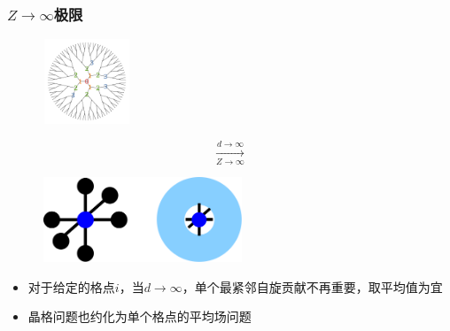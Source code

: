 {\frame
{
	\frametitle{$Z\rightarrow\infty$极限}
\begin{minipage}[b]{0.25\linewidth}
\begin{figure}[h!]
\centering
\includegraphics[height=1.0in,width=1.05in,viewport=0 0 1980 1980,clip]{Figures/Bethe-Lattice-Ising_Model.png}
\label{Bethe-Lattice_Ising-Model_Limit-1}
\end{figure}
\end{minipage}
\hfill
\begin{minipage}[t]{0.14\linewidth}
	\vspace{-1in} 
	\begin{displaymath}
		\xrightarrow[Z\rightarrow\infty]{d\rightarrow\infty}
	\end{displaymath}
\end{minipage}
\hfill
\begin{minipage}[b]{0.55\linewidth}
\begin{figure}[h!]
\centering
\includegraphics[height=1.0in,width=2.35in,viewport=0 0 1050 455,clip]{Figures/Bethe-Lattice.png}
\label{Bethe-Lattice_Ising-Model_Limit-2}
\end{figure}
\end{minipage}
\begin{itemize}
	\item 对于给定的格点$i$，当$d\rightarrow\infty$，单个最紧邻自旋贡献不再重要，取平均值为宜
	\item 晶格问题也约化为单个格点的平均场问题
\end{itemize}
}

}
